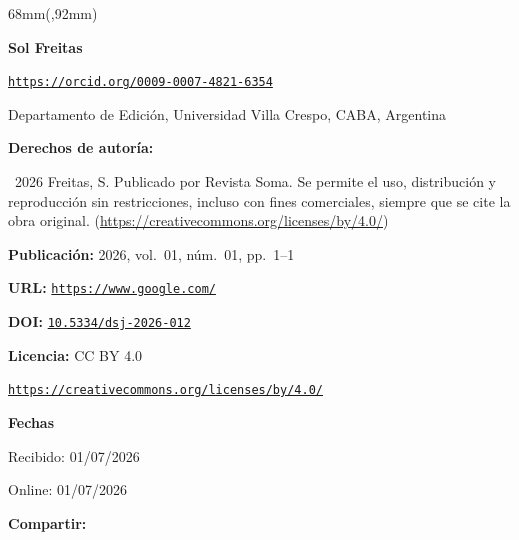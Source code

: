 \begin{textblock*}{68mm}(\gbbloquex,92mm)
{\setlength{\leftskip}{0pt}\setlength{\parindent}{0pt}%
\noindent\begin{minipage}[t]{68mm}
\sffamily\small\setlength{\parskip}{1pt}
{\bfseries\color{azulrevista}Sol Freitas}\par
{\scriptsize\texttt{\href{https://orcid.org/0009-0007-4821-6354}{https://orcid.org/0009-0007-4821-6354}}}\par
Departamento de Edición, Universidad Villa Crespo, CABA, Argentina\par
\vspace{6pt}
{\bfseries\color{azulrevista!70}Derechos de autor\'ia:}\par
\textcopyright\ 2026 Freitas, S. Publicado por Revista Soma. Se permite el uso, distribución y reproducción sin restricciones, incluso con fines comerciales, siempre que se cite la obra original. (\href{https://creativecommons.org/licenses/by/4.0/}{https://creativecommons.org/licenses/by/4.0/})\par\vspace{6pt}
{\bfseries\color{azulrevista!70}Publicación:} 2026, vol.~01, n\'um.~01, pp.~1--1\par\vspace{6pt}
{\bfseries\color{azulrevista!70}URL:} {\scriptsize\texttt{\href{https://www.google.com/}{https://www.google.com/}}}\par\vspace{6pt}
{\bfseries\color{azulrevista!70}DOI:} {\scriptsize\texttt{\href{https://doi.org/10.5334/dsj-2026-012}{10.5334/dsj-2026-012}}}\par\vspace{6pt}
{\bfseries\color{azulrevista!70}Licencia:} CC BY 4.0\par
{\scriptsize\texttt{\href{https://creativecommons.org/licenses/by/4.0/}{https://creativecommons.org/licenses/by/4.0/}}}\par
\vspace{6pt}
{\bfseries\color{azulrevista!70}Fechas}\par\vspace{2pt}
Recibido: 01/07/2026\par
Online: 01/07/2026\par
\vspace{6pt}
\vspace{6pt}
{\bfseries\color{azulrevista!70}Compartir:}\par\vspace{3pt}

\end{minipage}}
\end{textblock*}
